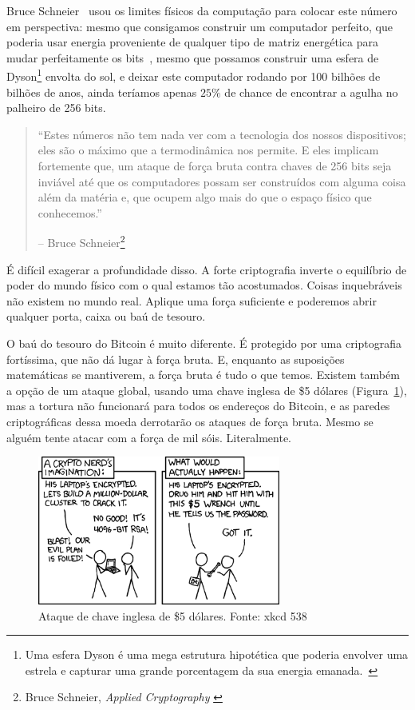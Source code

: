 Bruce Schneier~\cite{web:schneier} usou os limites físicos da computação para colocar este número em perspectiva: mesmo que consigamos construir um computador perfeito, que poderia usar energia proveniente de qualquer tipo de matriz energética para mudar perfeitamente os bits~\cite{wiki:landauer}, mesmo que possamos construir uma esfera de Dyson\footnote{Uma esfera Dyson é uma mega estrutura hipotética que poderia envolver uma estrela e capturar uma grande porcentagem da sua energia emanada.~\cite{wiki:dyson}} envolta do sol, e deixar este computador rodando por 100 bilhões de bilhões de anos, ainda teríamos apenas $25\%$ de chance de encontrar a agulha no palheiro de 256 bits.

\begin{quotation}\begin{samepage}
\enquote{Estes números não tem nada ver com a tecnologia dos nossos dispositivos; eles são o máximo que a termodinâmica nos permite. E eles implicam fortemente que, um ataque de força bruta contra chaves de 256 bits seja inviável até que os computadores possam ser construídos com alguma coisa além da matéria e, que ocupem algo mais do que o espaço físico que conhecemos.}
\begin{flushright} -- Bruce Schneier\footnote{Bruce Schneier, \textit{Applied Cryptography} \cite{bruce-schneier}}
\end{flushright}\end{samepage}\end{quotation}

É difícil exagerar a profundidade disso. A forte criptografia inverte o equilíbrio de poder do mundo físico com o qual estamos tão acostumados. Coisas inquebráveis não existem no mundo real. Aplique uma força suficiente e poderemos abrir qualquer porta, caixa ou baú de tesouro.

O baú do tesouro do Bitcoin é muito diferente. É protegido por uma criptografia fortíssima, que não dá lugar à força bruta. E, enquanto as suposições matemáticas se mantiverem, a força bruta é tudo o que temos. Existem também a opção de um ataque global, usando uma chave inglesa de \$5 dólares (Figura~\ref{fig:xkcd-538}), mas a tortura não funcionará para todos os endereços do Bitcoin, e as paredes criptográficas dessa moeda derrotarão os ataques de força bruta. Mesmo se alguém tente atacar com a força de mil sóis. Literalmente.

\begin{figure}
  \centering
  \includegraphics[width=8cm]{assets/images/xkcd-538.png}
  \caption{Ataque de chave inglesa de \$5 dólares. Fonte: xkcd 538}
  \label{fig:xkcd-538}
\end{figure}

